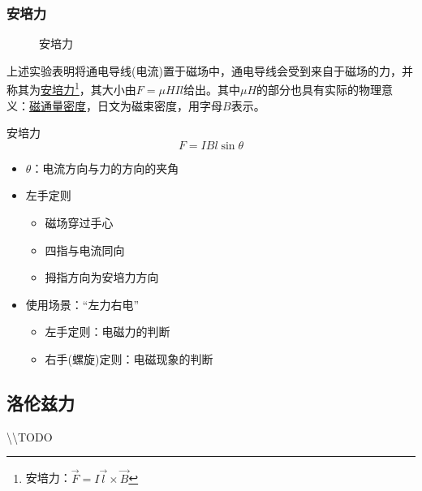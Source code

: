 \subsubsection{安培力}

\begin{figure}[ht!]
    \centering
    \caption{安培力}
\end{figure}
上述实验表明将通电导线(电流)置于磁场中，通电导线会受到来自于磁场的力，并称其为\underline{安培力}\footnote{安培力：$\vec{F}=I\vec{l}\times\vec{B}$}，其大小由$F=\mu HIl$给出。其中$\mu H$的部分也具有实际的物理意义：\underline{磁通量密度}，日文为磁束密度，用字母$B$表示。
\begin{itembox}[l]{安培力}
    \begin{equation*}
        F=IBl\sin\theta
    \end{equation*}
    \begin{itemize}
        \item $\theta$：电流方向与力的方向的夹角
        \item 左手定则
        \begin{itemize}
            \item 磁场穿过手心
            \item 四指与电流同向
            \item 拇指方向为安培力方向
        \end{itemize}
        \item 使用场景：“左力右电”
        \begin{itemize}
            \item 左手定则：电磁力的判断
            \item 右手(螺旋)定则：电磁现象的判断
        \end{itemize}
    \end{itemize}
\end{itembox}

\subsection{洛伦兹力}

\textbackslash\textbackslash TODO
